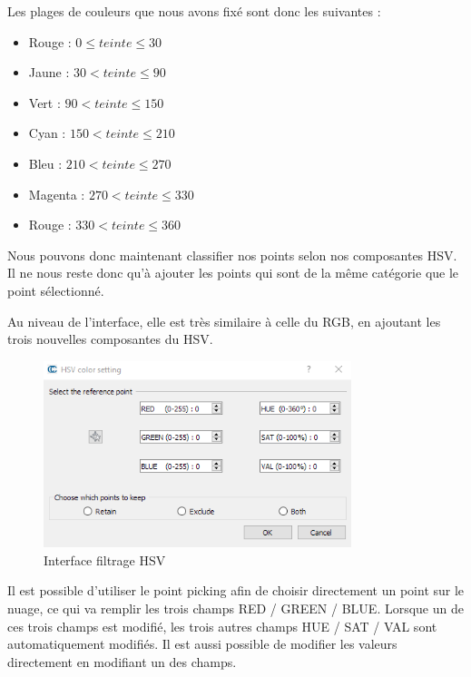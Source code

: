 \documentclass[12pt,titlepage,french]{article}
\begin{document}
Les plages de couleurs que nous avons fixé sont donc les suivantes :

\begin{itemize}
    \item Rouge : $0 \leq teinte \leq 30$
    \item Jaune : $30 < teinte \leq 90$
    \item Vert : $90 < teinte \leq 150$
    \item Cyan : $150 < teinte \leq 210$
    \item Bleu : $210 < teinte \leq 270$
    \item Magenta : $270 < teinte \leq 330$
    \item Rouge : $330 < teinte \leq 360$ \newline
\end{itemize}

Nous pouvons donc maintenant classifier nos points selon nos composantes HSV. Il ne nous reste donc qu'à ajouter les points qui sont de la même catégorie que le point sélectionné. \newline

Au niveau de l'interface, elle est très similaire à celle du RGB, en ajoutant les trois nouvelles composantes du HSV.

\begin{figure}[H]
\center \includegraphics[width=0.8\textwidth]{./img/ui_filter_hsv.PNG}
  \caption{\label{} Interface filtrage HSV}
\end{figure}

Il est possible d'utiliser le point picking afin de choisir directement un point sur le nuage, ce qui va remplir les trois champs RED / GREEN / BLUE. Lorsque un de ces trois champs est modifié, les trois autres champs HUE / SAT / VAL sont automatiquement modifiés. Il est aussi possible de modifier les valeurs directement en modifiant un des champs. \newline
\end{document}
